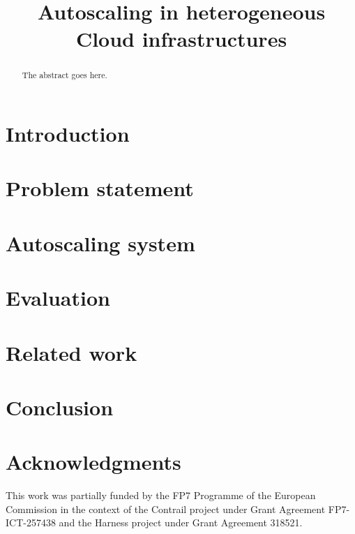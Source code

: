 \documentclass[conference]{IEEEtran}
\begin{document}
\title{Autoscaling in heterogeneous Cloud infrastructures}

\author{
\and
{}
\and
{}
}

\maketitle

\begin{abstract}
  The abstract goes here.
\end{abstract}


\section{Introduction}

\label{sec:introduction}

\section{Problem statement}

\label{sec:motivation}

\section{Autoscaling system}
\label{sec:proposed_approach}


\section{Evaluation}
\label{sec:evaluation}


\section{Related work}
\label{sec:relatedWorks}



\section{Conclusion}
\label{sec:conclusion}



\section*{Acknowledgments}

This work was partially funded by the FP7 Programme of the European
Commission in the context of the Contrail project under Grant
Agreement FP7-ICT-257438 and the Harness project under Grant Agreement
318521.




\end{document}
